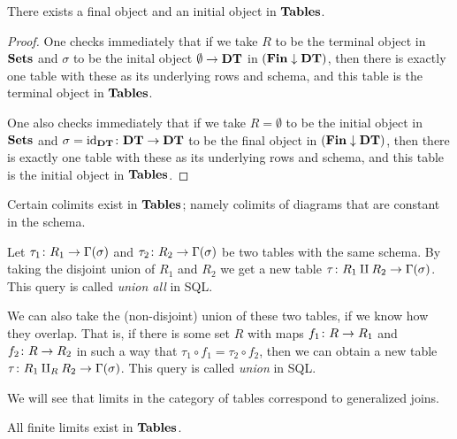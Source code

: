 \documentclass{amsart}
\def\DT{{\bf DT}}
\def\Tables{{\bf Tables}}
\def\Fin{{\bf Fin}}
\begin{document}
\begin{lemma}\label{final object}

There exists a final object and an initial object in $\Tables$.    

\end{lemma}

\begin{proof}

One checks immediately that if we take $R$ to be the terminal object in ${\bf Sets}$ and $\sigma$ to be the inital object $\emptyset\to\DT$ in $(\Fin\down\DT)$, then there is exactly one table with these as its underlying rows and schema, and this table is the terminal object in $\Tables$.

One also checks immediately that if we take $R=\emptyset$ to be the initial object in ${\bf Sets}$ and $\sigma=\id_{\DT}\taking\DT\to\DT$ to be the final object in $(\Fin\down\DT)$, then there is exactly one table with these as its underlying rows and schema, and this table is the initial object in $\Tables$.

\end{proof}

Certain colimits exist in $\Tables$; namely colimits of diagrams that are constant in the schema.

\begin{construction}

Let $\tau_1\colon R_1\rightarrow\Gamma(\sigma)$ and $\tau_2\colon R_2\rightarrow\Gamma(\sigma)$ be two tables with the same schema.  By taking the disjoint union of $R_1$ and $R_2$ we get a new table $\tau\colon R_1\amalg R_2\rightarrow\Gamma(\sigma)$.  This query is called {\em union all} in SQL.  

We can also take the (non-disjoint) union of these two tables, if we know how they overlap.  That is, if there is some set $R$ with maps $f_1\colon R\rightarrow R_1$ and $f_2\colon R\rightarrow R_2$ in such a way that $\tau_1\circ f_1=\tau_2\circ f_2$, then we can obtain a new table $\tau\colon R_1\amalg_RR_2\rightarrow\Gamma(\sigma)$.  This query is called {\em union} in SQL.

\end{construction}

We will see that limits in the category of tables correspond to generalized joins.

\begin{proposition}\label{finite limits exist}

All finite limits exist in $\Tables$.

\end{proposition}
\end{document}
